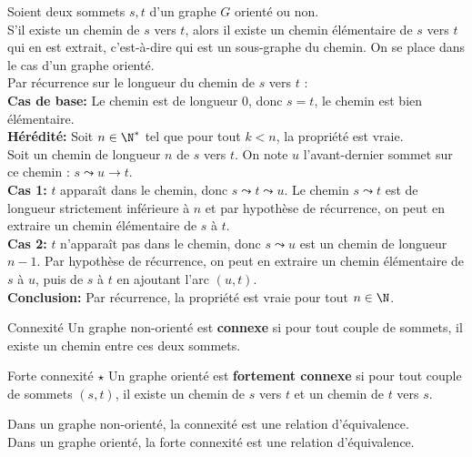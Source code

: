 \documentclass[french, 11pt]{article}
\begin{document}
\begin{prop}{}{}
    Soient deux sommets $s,t$ d'un graphe $G$ orienté ou non.\\
    S'il existe un chemin de $s$ vers $t$, alors il existe un chemin élémentaire de $s$ vers $t$ qui en est extrait, c'est-à-dire qui est un sous-graphe du chemin.
    \tcblower
    On se place dans le cas d'un graphe orienté.\\
    Par récurrence sur le longueur du chemin de $s$ vers $t$ :\\
    \textbf{Cas de base:} Le chemin est de longueur 0, donc $s=t$, le chemin est bien élémentaire.\\
    \textbf{Hérédité:} Soit $n\in\N^*$ tel que pour tout $k<n$, la propriété est vraie.\\
    Soit un chemin de longueur $n$ de $s$ vers $t$. On note $u$ l'avant-dernier sommet sur ce chemin : $s\leadsto u \to t$.\\
    \textbf{Cas 1:} $t$ apparaît dans le chemin, donc $s\leadsto t \leadsto u$. Le chemin $s\leadsto t$ est de longueur strictement inférieure à $n$ et par hypothèse de récurrence, on peut en extraire un chemin élémentaire de $s$ à $t$.\\
    \textbf{Cas 2:} $t$ n'apparaît pas dans le chemin, donc $s\leadsto u$ est un chemin de longueur $n-1$. Par hypothèse de récurrence, on peut en extraire un chemin élémentaire de $s$ à $u$, puis de $s$ à $t$ en ajoutant l'arc $(u,t)$.\\
    \textbf{Conclusion:} Par récurrence, la propriété est vraie pour tout $n\in\N$.
\end{prop}

\begin{defi}{Connexité}{}
    Un graphe non-orienté est \textbf{connexe} si pour tout couple de sommets, il existe un chemin entre ces deux sommets.
\end{defi}

\begin{defi}{Forte connexité $\star$}{}
    Un graphe orienté est \textbf{fortement connexe} si pour tout couple de sommets $(s,t)$, il existe un chemin de $s$ vers $t$ et un chemin de $t$ vers $s$.
\end{defi}

\begin{prop}{}{}
    Dans un graphe non-orienté, la connexité est une relation d'équivalence.\\
    Dans un graphe orienté, la forte connexité est une relation d'équivalence.
\end{prop}
\end{document}
